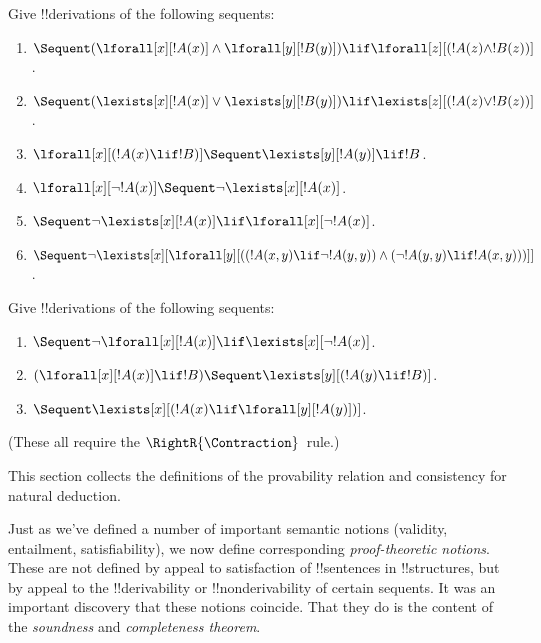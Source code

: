 \begin{prob}
Give !!{derivation}s of the following sequents:
\begin{enumerate}
\item $\Sequent (\lforall[x][!A(x)] \land \lforall[y][!B(y)]) \lif
\lforall[z][(!A(z) \land !B(z))]$.
\item $\Sequent (\lexists[x][!A(x)] \lor \lexists[y][!B(y)]) \lif
\lexists[z][(!A(z) \lor !B(z))]$.
\item $\lforall[x][(!A(x) \lif !B)] \Sequent \lexists[y][!A(y)] \lif !B$.
\item $\lforall[x][\lnot !A(x)] \Sequent \lnot\lexists[x][!A(x)]$.
\item $\Sequent \lnot\lexists[x][!A(x)] \lif \lforall[x][\lnot !A(x)]$.
\item $\Sequent \lnot\lexists[x][\lforall[y][((!A(x,y) \lif \lnot
!A(y,y)) \land (\lnot !A(y,y) \lif !A(x,y)))]]$.
\end{enumerate}
\end{prob}

\begin{prob}
Give !!{derivation}s of the following sequents:
\begin{enumerate}
\item $\Sequent \lnot\lforall[x][!A(x)] \lif \lexists[x][\lnot!A(x)]$.
\item $(\lforall[x][!A(x)] \lif !B) \Sequent \lexists[y][(!A(y) \lif !B)]$.
\item $\Sequent \lexists[x][(!A(x) \lif \lforall[y][!A(y)])]$.
\end{enumerate}
(These all require the $\RightR{\Contraction}$~rule.)
\end{prob}






\begin{editorial}
  This section collects the definitions of the provability relation and
  consistency for natural deduction.
\end{editorial}



\begin{explain}
Just as we've defined a number of important semantic notions
(validity, entailment, satisfiability), we now define corresponding
\emph{proof-theoretic notions}.  These are not defined by appeal to
satisfaction of !!{sentence}s in !!{structure}s, but by appeal to the
!!{derivability} or !!{nonderivability} of certain sequents.  It was
an important discovery that these notions coincide.  That they do is
the content of the \emph{soundness} and \emph{completeness theorem}.
\end{explain}

